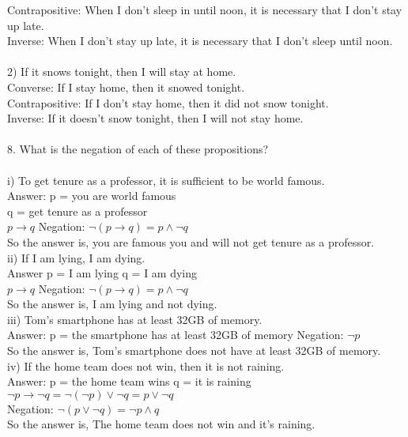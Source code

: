 \documentclass[11pt, oneside]{article}   	%
\begin{document}
Contrapositive: When I don't sleep in until noon, it is necessary that I don't stay up late.\\
Inverse: When I don't stay up late, it is necessary that I don't sleep until noon.\\\\
2)  If it snows tonight, then I will stay at home.\\
Converse: If I stay home, then it snowed tonight.\\
Contrapositive:  If I don't stay home, then it did not snow tonight.\\
Inverse: If it doesn't snow tonight, then I will not stay home.\\\\
8. What is the negation of each of these propositions?\\\\

i) To get tenure as a professor, it is sufficient to be world famous.\\
\indent Answer: p = you are world famous\\
\indent q = get tenure as a professor\\
\indent $p\to q $
\indent Negation: $\neg (p\to q) = p \wedge\neg q$\\
\indent So the answer is, you are famous you and will not get tenure as a professor. \\

ii) If I am lying, I am dying.\\
\indent Answer p = I am lying  q = I am dying\\
\indent $p\to q$
\indent Negation: $\neg (p\to q) = p \wedge\neg q$\\
\indent So the answer is, I am lying and not dying.\\

iii) Tom's smartphone has at least 32GB of memory.\\
\indent Answer: p = the smartphone has at least 32GB of memory
\indent Negation: $\neg p$\\
\indent So the answer is, Tom's smartphone does not have at least 32GB of memory. \\

iv) If the home team does not win, then it is not raining.\\
\indent Answer: p = the home team wins   q = it is raining\\
\indent $\neg p\to\neg q = \neg(\neg p)\lor \neg q = p\lor\neg q$\\
\indent Negation: $\neg (p\lor\neg q) = \neg p\wedge q$\\
\indent So the answer is, The home team does not win and it's raining. \\\\
\end{document}
